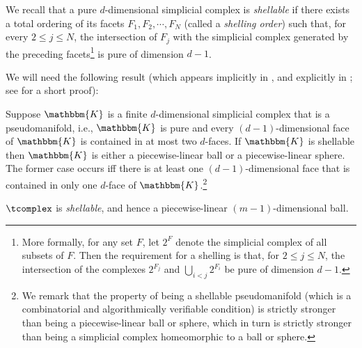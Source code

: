 We recall that a pure $d$-dimensional simplicial complex is \emph{shellable} if 
there exists a total ordering of its facets $F_{1},F_{2},\cdots,F_{N}$ (called a \emph{shelling order})
such that, for every $2\leq j\leq N$, the intersection of $F_j$ with the simplicial complex 
generated by the preceding facets\footnote{More formally, for any set $F$, let $2^F$ denote the simplicial complex of all subsets of $F$. Then the requirement for a shelling is that, for $2\leq j\leq N$, the intersection of the complexes $2^{F_j}$ and $\bigcup_{i<j}2^{F_i}$ be pure of dimension $d-1$.} is pure of dimension $d-1$.




We will need the following result (which appears implicitly in \cite{Bing:Some-aspects-of-the-topology-of-3-manifolds-1964}, and explicitly in \cite{danaraj1974shellings}; see \cite[Prop.~4.7.22]{Bjorner:Oriented-matroids-1999} for a short proof):
\begin{proposition}
\label{prop:shellable}
Suppose $\mathbbm{K}$ is a finite $d$-dimensional simplicial complex that is a pseudomanifold, i.e., $\mathbbm{K}$ is pure and every $(d-1)$-dimensional face of $\mathbbm{K}$ is contained in at most two $d$-faces. 
If $\mathbbm{K}$ is shellable then $\mathbbm{K}$ is either a piecewise-linear ball or a piecewise-linear sphere. The former case occurs iff 
there is at least one $(d-1)$-dimensional face that is contained in only one $d$-face of $\mathbbm{K}$.\footnote{We remark that the property of being a shellable pseudomanifold (which is a combinatorial and algorithmically verifiable condition) is strictly stronger than being a piecewise-linear ball or sphere, which in turn is strictly stronger than being a simplicial complex homeomorphic to a ball or sphere.}
\end{proposition}

\begin{theorem}
\label{Ball theorem} 
\label{ball thm}
$\tcomplex$ is \emph{shellable}, and hence a piecewise-linear $(m-1)$-dimensional ball.%
\end{theorem}

